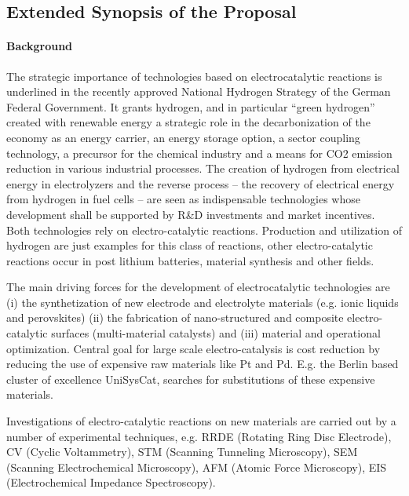 \documentclass[a4paper,10pt]{article}
\begin{document}
\insertProjectHeader


\subsection*{Extended Synopsis of the Proposal}

\paragraph{Background}



The strategic importance of technologies based on electrocatalytic reactions is underlined in the recently approved National Hydrogen Strategy of the German Federal Government.  It grants hydrogen, and in particular ``green hydrogen'' created with renewable energy a strategic role in the decarbonization of the economy as an energy carrier, an energy storage option, a sector coupling technology, a precursor for the chemical industry and a means for CO2 emission reduction in various industrial processes.
The creation of hydrogen from electrical energy in electrolyzers and the reverse process -- the recovery of electrical energy from hydrogen in fuel cells -- are seen as indispensable technologies whose development shall be supported by R\&D investments and market incentives.
%
Both technologies rely on electro-catalytic reactions. Production and utilization of hydrogen are just examples for this class of reactions, other electro-catalytic reactions occur in post lithium batteries, material synthesis and other fields.

The main driving forces for the development of electrocatalytic technologies are (i) the synthetization of new electrode and electrolyte materials (e.g. ionic liquids and perovskites) (ii) the fabrication of nano-structured and composite electro-catalytic surfaces (multi-material catalysts) and (iii) material and operational optimization. Central goal for large scale electro-catalysis is cost
reduction by reducing the use of expensive raw materials like Pt and  Pd. E.g. the Berlin based cluster of excellence UniSysCat, searches for substitutions of these expensive materials.

Investigations of electro-catalytic reactions on new materials
are carried out by a number of  experimental techniques,  e.g.
RRDE    (Rotating   Ring    Disc   Electrode),
CV  (Cyclic  Voltammetry),
STM (Scanning Tunneling Microscopy),
SEM (Scanning  Electrochemical Microscopy),
AFM (Atomic Force Microscopy),
EIS (Electrochemical Impedance Spectroscopy).
\end{document}
